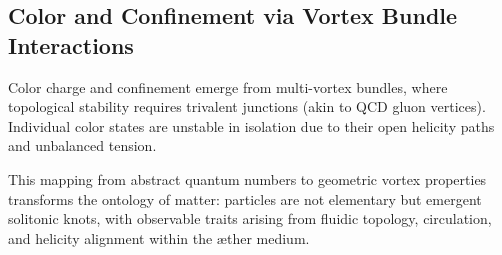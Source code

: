 \subsection{Color and Confinement via Vortex Bundle Interactions}

Color charge and confinement emerge from multi-vortex bundles, where topological stability requires trivalent junctions (akin to QCD gluon vertices). Individual color states are unstable in isolation due to their open helicity paths and unbalanced tension.

\bigskip

This mapping from abstract quantum numbers to geometric vortex properties transforms the ontology of matter: particles are not elementary but emergent solitonic knots, with observable traits arising from fluidic topology, circulation, and helicity alignment within the æther medium.
